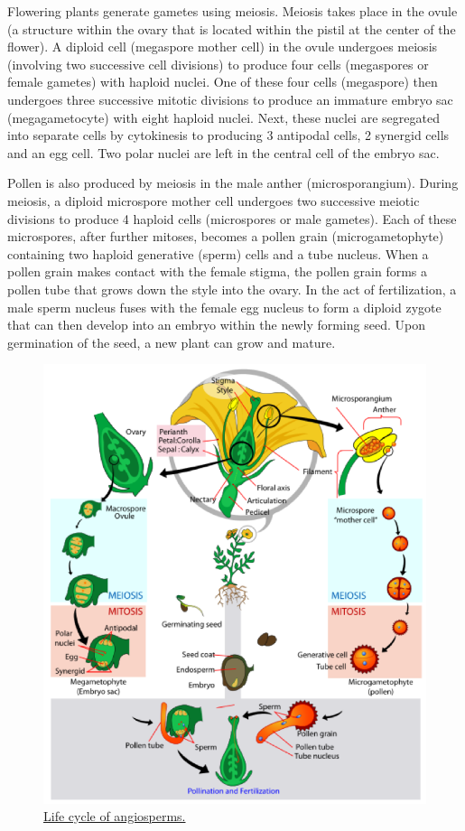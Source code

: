Flowering plants generate gametes using meiosis. Meiosis takes place in the ovule (a structure within the
ovary that is located within the pistil at the center of the flower). A
diploid cell (megaspore mother cell) in the ovule undergoes meiosis
(involving two successive cell divisions) to produce four cells
(megaspores or female gametes) with haploid nuclei. One of these four
cells (megaspore) then undergoes three successive mitotic divisions to
produce an immature embryo sac (megagametocyte) with eight haploid
nuclei. Next, these nuclei are segregated into separate cells by
cytokinesis to producing 3 antipodal cells, 2 synergid cells and an egg
cell. Two polar nuclei are left in the central cell of the embryo sac.

Pollen is also produced by meiosis in the male anther (microsporangium).
During meiosis, a diploid microspore mother cell undergoes two
successive meiotic divisions to produce 4 haploid cells (microspores or
male gametes). Each of these microspores, after further mitoses, becomes
a pollen grain (microgametophyte) containing two haploid generative
(sperm) cells and a tube nucleus. When a pollen grain makes contact with
the female stigma, the pollen grain forms a pollen tube that grows down
the style into the ovary. In the act of fertilization, a male sperm
nucleus fuses with the female egg nucleus to form a diploid zygote that
can then develop into an embryo within the newly forming seed. Upon
germination of the seed, a new plant can grow and mature.

\begin{figure}

{\centering \includegraphics[width=0.7\linewidth]{./figures/gymnosperms/angiosperm_life_cycle}

}

\caption{\href{https://commons.wikimedia.org/wiki/File:Angiosperm_life_cycle_diagram-en.svg}{Life
cycle of angiosperms.}}\label{fig:angiosperm}
\end{figure}

